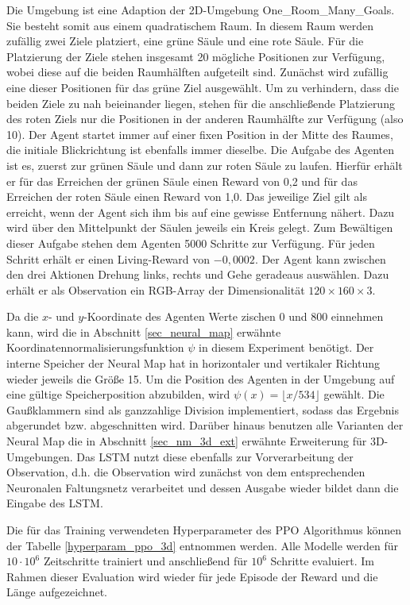 Die Umgebung ist eine Adaption der 2D-Umgebung \glqq One\_Room\_Many\_Goals\grqq{}. Sie besteht somit aus einem quadratischem Raum. In diesem Raum werden zufällig zwei Ziele platziert, eine grüne Säule und eine rote Säule. Für die Platzierung der Ziele stehen insgesamt 20 mögliche Positionen zur Verfügung, wobei diese auf die beiden Raumhälften aufgeteilt sind. Zunächst wird zufällig eine dieser Positionen für das grüne Ziel ausgewählt. Um zu verhindern, dass die beiden Ziele zu nah beieinander liegen, stehen für die anschließende Platzierung des roten Ziels nur die Positionen in der anderen Raumhälfte zur Verfügung (also 10). Der Agent startet immer auf einer fixen Position in der Mitte des Raumes, die initiale Blickrichtung ist ebenfalls immer dieselbe. Die Aufgabe des Agenten ist es, zuerst zur grünen Säule und dann zur roten Säule zu laufen. Hierfür erhält er für das Erreichen der grünen Säule einen Reward von 0,2 und für das Erreichen der roten Säule einen Reward von 1,0. Das jeweilige Ziel gilt als erreicht, wenn der Agent sich ihm bis auf eine gewisse Entfernung nähert. Dazu wird über den Mittelpunkt der Säulen jeweils ein Kreis gelegt. Zum Bewältigen dieser Aufgabe stehen dem Agenten 5000 Schritte zur Verfügung. Für jeden Schritt erhält er einen Living-Reward von $-0,0002$. Der Agent kann zwischen den drei Aktionen \glqq Drehung links\grqq{}, \glqqDrehung rechts\grqq{} und \glqq Gehe geradeaus\grqq{} auswählen. Dazu erhält er als Observation ein RGB-Array der Dimensionalität $120 \times 160 \times 3$.

Da die $x$- und $y$-Koordinate des Agenten Werte zischen 0 und 800 einnehmen kann, wird die in Abschnitt \ref{sec_neural_map} erwähnte Koordinatennormalisierungsfunktion $\psi$ in diesem Experiment benötigt. Der interne Speicher der Neural Map hat in horizontaler und vertikaler Richtung wieder jeweils die Größe 15. Um die Position des Agenten in der Umgebung auf eine gültige Speicherposition abzubilden, wird $\psi(x) = \lfloor x / 534\rfloor$ gewählt. Die Gaußklammern sind als ganzzahlige Division implementiert, sodass das Ergebnis abgerundet bzw. abgeschnitten wird. Darüber hinaus benutzen alle Varianten der Neural Map die in Abschnitt \ref{sec_nm_3d_ext} erwähnte Erweiterung für 3D-Umgebungen. Das LSTM nutzt diese ebenfalls zur Vorverarbeitung der Observation, d.h. die Observation wird zunächst von dem entsprechenden Neuronalen Faltungsnetz verarbeitet und dessen Ausgabe wieder bildet dann die Eingabe des LSTM.

Die für das Training verwendeten Hyperparameter des PPO Algorithmus können der Tabelle \ref{hyperparam_ppo_3d} entnommen werden. Alle Modelle werden für $10\cdot10^6$ Zeitschritte trainiert und anschließend für $10^6$ Schritte evaluiert. Im Rahmen dieser Evaluation wird wieder für jede Episode der Reward und die Länge aufgezeichnet.

